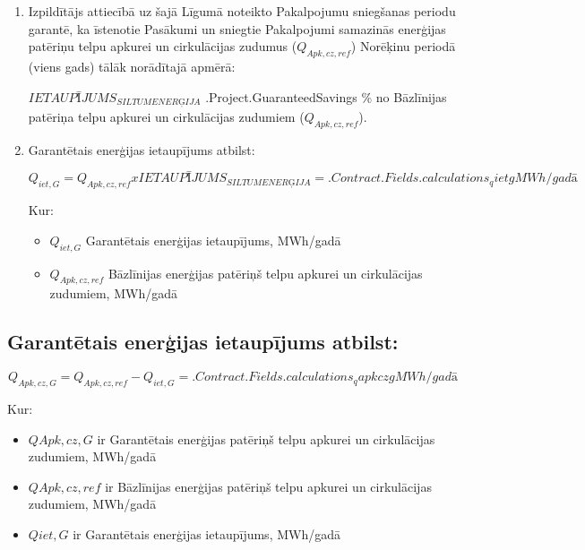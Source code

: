 \begin{enumerate}
	\item Izpildītājs attiecībā uz šajā Līgumā noteikto Pakalpojumu sniegšanas periodu garantē, ka īstenotie Pasākumi un sniegtie Pakalpojumi samazinās enerģijas patēriņu telpu apkurei un cirkulācijas zudumus ($Q_{Apk,cz,ref}$) Norēķinu periodā (viens gads) tālāk norādītajā apmērā:

	$IETAUPĪJUMS_{SILTUMENERĢIJA}$ \iffalse input project.savings value="{{.Project.GuaranteedSavings}}" \fi {{.Project.GuaranteedSavings}} \% no Bāzlīnijas patēriņa telpu apkurei un cirkulācijas zudumiem ($Q_{Apk,cz,ref}$).

	\item Garantētais enerģijas ietaupījums atbilst:

\[Q_{iet,G} = Q_{Apk, cz, ref} x IETAUPĪJUMS_{SILTUMENERĢIJA} = {{.Contract.Fields.calculations_qietg}} MWh/gadā\]


Kur:
\begin{itemize}
	\item $Q_{iet,G}$	Garantētais enerģijas ietaupījums, MWh/gadā
	\item $Q_{Apk,cz,ref}$	Bāzlīnijas enerģijas patēriņš telpu apkurei un cirkulācijas zudumiem, MWh/gadā
\end{itemize}

\end{enumerate}

\subsection{Garantētais enerģijas ietaupījums atbilst:}

\[Q_{Apk,cz,G} = Q_{Apk,cz,ref} - Q_{iet,G} = {{.Contract.Fields.calculations_qapkczg}} MWh/gadā\]

Kur:

\begin{itemize}
	\item $QApk,cz,G$	ir Garantētais enerģijas patēriņš telpu apkurei un cirkulācijas zudumiem, MWh/gadā
	\item $QApk,cz,ref$	ir Bāzlīnijas enerģijas patēriņš telpu apkurei un cirkulācijas zudumiem, MWh/gadā
	\item $Qiet,G$	ir Garantētais enerģijas ietaupījums, MWh/gadā
\end{itemize}
